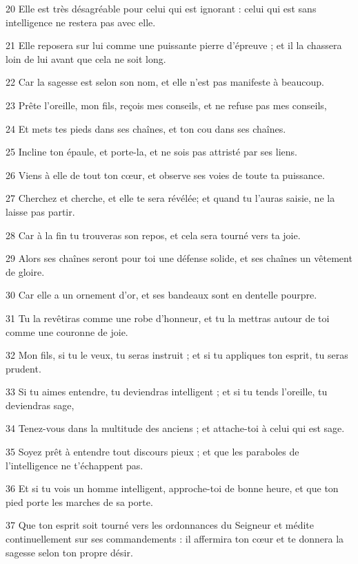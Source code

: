 \par 20 Elle est très désagréable pour celui qui est ignorant : celui qui est sans intelligence ne restera pas avec elle.
\par 21 Elle reposera sur lui comme une puissante pierre d'épreuve ; et il la chassera loin de lui avant que cela ne soit long.
\par 22 Car la sagesse est selon son nom, et elle n'est pas manifeste à beaucoup.
\par 23 Prête l'oreille, mon fils, reçois mes conseils, et ne refuse pas mes conseils,
\par 24 Et mets tes pieds dans ses chaînes, et ton cou dans ses chaînes.
\par 25 Incline ton épaule, et porte-la, et ne sois pas attristé par ses liens.
\par 26 Viens à elle de tout ton cœur, et observe ses voies de toute ta puissance.
\par 27 Cherchez et cherche, et elle te sera révélée; et quand tu l'auras saisie, ne la laisse pas partir.
\par 28 Car à la fin tu trouveras son repos, et cela sera tourné vers ta joie.
\par 29 Alors ses chaînes seront pour toi une défense solide, et ses chaînes un vêtement de gloire.
\par 30 Car elle a un ornement d'or, et ses bandeaux sont en dentelle pourpre.
\par 31 Tu la revêtiras comme une robe d'honneur, et tu la mettras autour de toi comme une couronne de joie.
\par 32 Mon fils, si tu le veux, tu seras instruit ; et si tu appliques ton esprit, tu seras prudent.
\par 33 Si tu aimes entendre, tu deviendras intelligent ; et si tu tends l'oreille, tu deviendras sage,
\par 34 Tenez-vous dans la multitude des anciens ; et attache-toi à celui qui est sage.
\par 35 Soyez prêt à entendre tout discours pieux ; et que les paraboles de l'intelligence ne t'échappent pas.
\par 36 Et si tu vois un homme intelligent, approche-toi de bonne heure, et que ton pied porte les marches de sa porte.
\par 37 Que ton esprit soit tourné vers les ordonnances du Seigneur et médite continuellement sur ses commandements : il affermira ton cœur et te donnera la sagesse selon ton propre désir.

